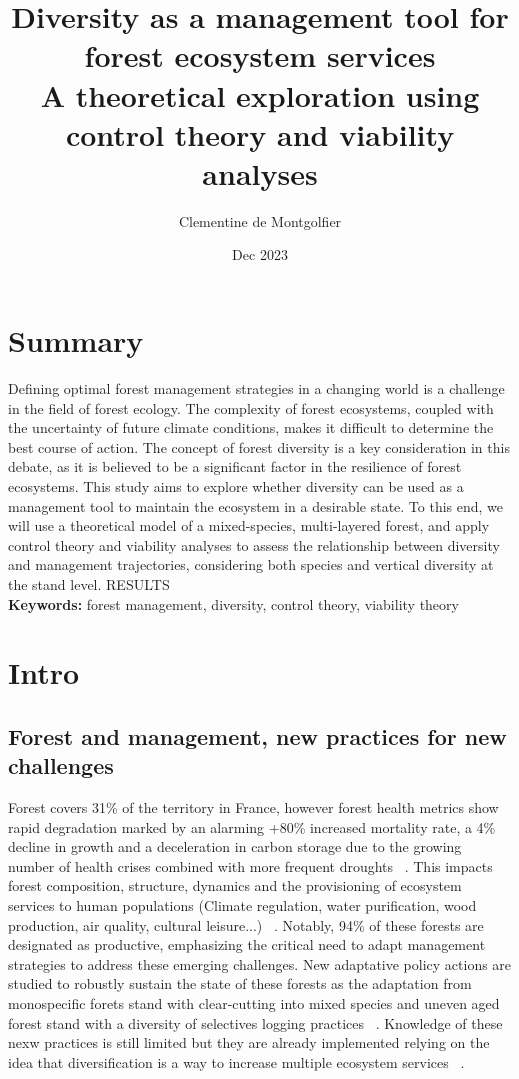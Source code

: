 \documentclass{article}
\title{Diversity as a management tool for forest ecosystem services \\ 
\large A theoretical exploration using control theory and viability analyses}
\author{Clementine de Montgolfier}
\date{Dec 2023}
\begin{document}
\maketitle

\section{Summary}

Defining optimal forest management strategies in a changing world is a challenge in the field of forest ecology. The complexity of forest ecosystems, coupled with the uncertainty of future climate conditions, makes it difficult to determine the best course of action. The concept of forest diversity is a key consideration in this debate, as it is believed to be a significant factor in the resilience of forest ecosystems. This study aims to explore whether diversity can be used as a management tool to maintain the ecosystem in a desirable state. To this end, we will use a theoretical model of a mixed-species, multi-layered forest, and apply control theory and viability analyses to assess the relationship between diversity and management trajectories, considering both species and vertical diversity at the stand level. RESULTS\\

\noindent \textbf{Keywords:} forest management, diversity, control theory, viability theory

\section{Intro}

\subsection{Forest and management, new practices for new challenges}

Forest covers 31\% of the territory in France, however forest health metrics show rapid degradation  marked by an alarming +80\% increased mortality rate, a 4\% decline in growth and a deceleration in carbon storage due to the growing number of health crises combined with more frequent droughts ~\autocite{IGN}. This impacts forest composition, structure, dynamics and the provisioning of ecosystem services to human populations (Climate regulation, water purification, wood production, air quality, cultural leisure...) ~\autocite{grammatikopoulouValueForestEcosystem2021}. Notably, 94\% of these forests are designated as productive, emphasizing the critical need to adapt management strategies to address these emerging challenges. 
New adaptative policy actions are studied to robustly sustain the state of these forests as the adaptation from monospecific forets stand with clear-cutting into mixed species and uneven aged forest stand with a diversity of selectives logging practices  ~\autocite{REFSautre, raymondIrregularShelterwoodSystem2009}. Knowledge of these nexw practices is still limited but they are already implemented relying on the idea that diversification is a way to increase multiple ecosystem services ~\autocite{tilmanBiodiversityPopulationEcosystem1996}.
\end{document}
